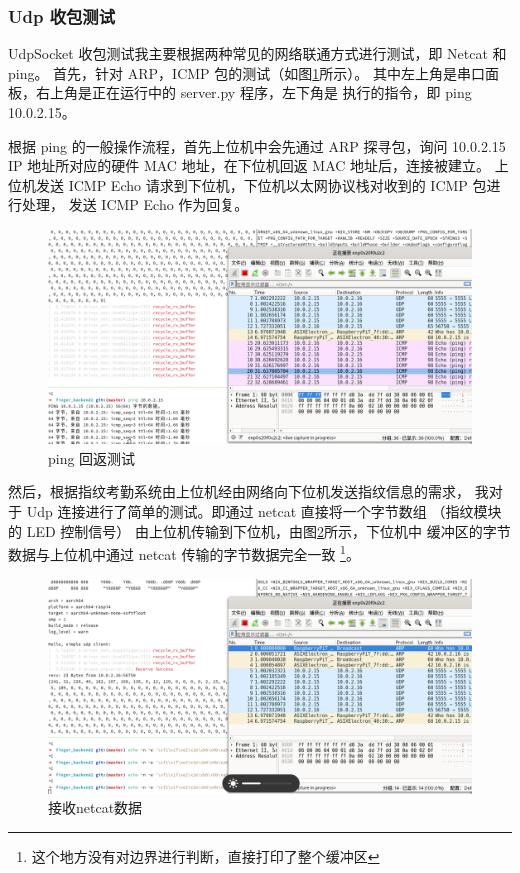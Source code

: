     \subsubsection{Udp 收包测试}

    UdpSocket 收包测试我主要根据两种常见的网络联通方式进行测试，即 Netcat 和 ping。
    首先，针对 ARP，ICMP 包的测试（如图\ref{test::pingICMP回返测试}所示）。
    其中左上角是串口面板，右上角是正在运行中的 server.py 程序，左下角是
    执行的指令，即 ping 10.0.2.15。
    
    根据 ping 的一般操作流程，首先上位机中会先通过 ARP 探寻包，询问 10.0.2.15
    IP 地址所对应的硬件 MAC 地址，在下位机回返 MAC 地址后，连接被建立。
    上位机发送 ICMP Echo 请求到下位机，下位机以太网协议栈对收到的 ICMP 包进行处理，
    发送 ICMP Echo 作为回复。

    \begin{figure}[ht]
        \centering
        \caption{ping 回返测试}    \label{test::pingICMP回返测试}
        \includegraphics[width=\textwidth]{./imgs/测试-pingICMP回返测试.png}
    \end{figure}   

    然后，根据指纹考勤系统由上位机经由网络向下位机发送指纹信息的需求，
    我对于 Udp 连接进行了简单的测试。即通过 netcat 直接将一个字节数组
    （指纹模块的 LED 控制信号）
    由上位机传输到下位机，由图\ref{test::接收netcat数据}所示，下位机中
    缓冲区的字节数据与上位机中通过 netcat 传输的字节数据完全一致
    \footnote{这个地方没有对边界进行判断，直接打印了整个缓冲区}。

    \begin{figure}[ht]
        \centering
        \caption{接收netcat数据}    \label{test::接收netcat数据}
        \includegraphics[width=\textwidth]{./imgs/测试-接收netcat数据.png}
    \end{figure}   


